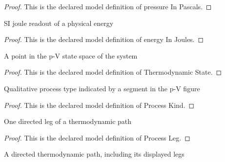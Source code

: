 \begin{proof}
  This is the declared model definition of pressure In Pascals.
\end{proof}
\begin{definition}
  \label{def:physics:phyx-mini-0340:phyxminiproblems-problemphyxmini0340-energyinjoules}
  SI joule readout of a physical energy
\end{definition}
\begin{proof}
  This is the declared model definition of energy In Joules.
\end{proof}
\begin{definition}
  \label{def:physics:phyx-mini-0340:phyxminiproblems-problemphyxmini0340-thermodynamicstate}
  A point in the p-V state space of the system
\end{definition}
\begin{proof}
  This is the declared model definition of Thermodynamic State.
\end{proof}
\begin{definition}
  \label{def:physics:phyx-mini-0340:phyxminiproblems-problemphyxmini0340-processkind}
  Qualitative process type indicated by a segment in the p-V figure
\end{definition}
\begin{proof}
  This is the declared model definition of Process Kind.
\end{proof}
\begin{definition}
  \label{def:physics:phyx-mini-0340:phyxminiproblems-problemphyxmini0340-processleg}
  One directed leg of a thermodynamic path
\end{definition}
\begin{proof}
  This is the declared model definition of Process Leg.
\end{proof}
\begin{definition}
  \label{def:physics:phyx-mini-0340:phyxminiproblems-problemphyxmini0340-thermodynamicpath}
  A directed thermodynamic path, including its displayed legs
\end{definition}
